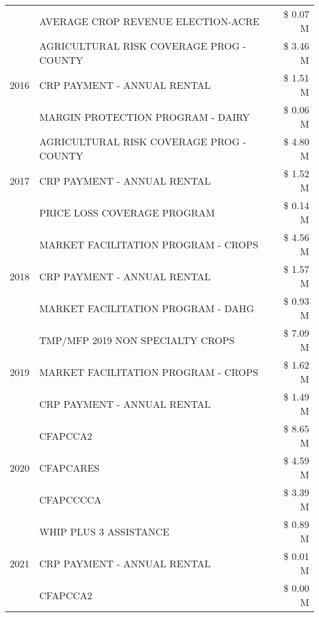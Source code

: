 \begin{tabular}{llr}
 & AVERAGE CROP REVENUE ELECTION-ACRE & \$ 0.07 M \\
\cline{1-3}
\multirow[t]{3}{*}{2016} & AGRICULTURAL RISK COVERAGE PROG - COUNTY & \$ 3.46 M \\
 & CRP PAYMENT - ANNUAL RENTAL & \$ 1.51 M \\
 & MARGIN PROTECTION PROGRAM - DAIRY & \$ 0.06 M \\
\cline{1-3}
\multirow[t]{3}{*}{2017} & AGRICULTURAL RISK COVERAGE PROG - COUNTY & \$ 4.80 M \\
 & CRP PAYMENT - ANNUAL RENTAL & \$ 1.52 M \\
 & PRICE LOSS COVERAGE PROGRAM & \$ 0.14 M \\
\cline{1-3}
\multirow[t]{3}{*}{2018} & MARKET FACILITATION PROGRAM - CROPS & \$ 4.56 M \\
 & CRP PAYMENT - ANNUAL RENTAL & \$ 1.57 M \\
 & MARKET FACILITATION PROGRAM - DAHG & \$ 0.93 M \\
\cline{1-3}
\multirow[t]{3}{*}{2019} & TMP/MFP 2019 NON SPECIALTY CROPS & \$ 7.09 M \\
 & MARKET FACILITATION PROGRAM - CROPS & \$ 1.62 M \\
 & CRP PAYMENT - ANNUAL RENTAL & \$ 1.49 M \\
\cline{1-3}
\multirow[t]{3}{*}{2020} & CFAPCCA2 & \$ 8.65 M \\
 & CFAPCARES & \$ 4.59 M \\
 & CFAPCCCCA & \$ 3.39 M \\
\cline{1-3}
\multirow[t]{3}{*}{2021} & WHIP PLUS 3 ASSISTANCE & \$ 0.89 M \\
 & CRP PAYMENT - ANNUAL RENTAL & \$ 0.01 M \\
 & CFAPCCA2 & \$ 0.00 M \\
\cline{1-3}
\bottomrule
\end{tabular}
